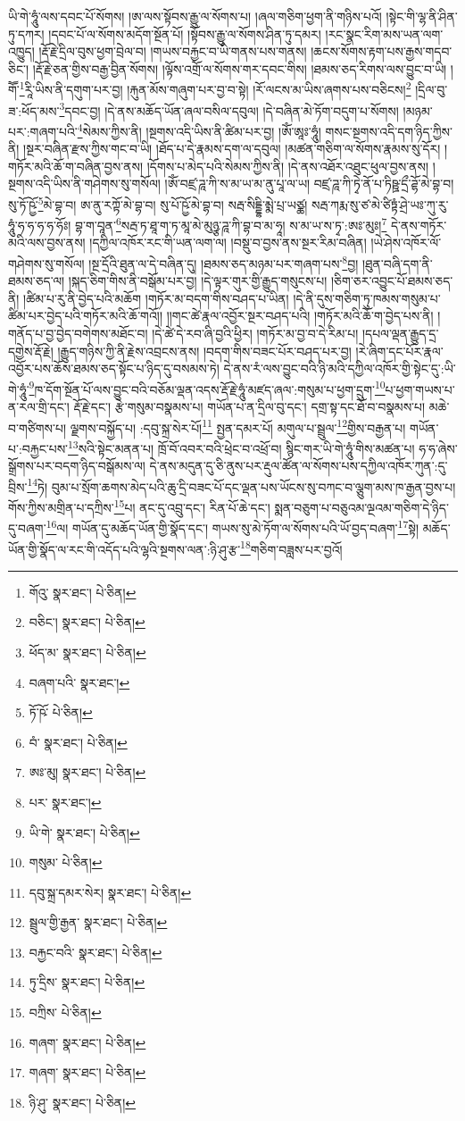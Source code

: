 ཡི་གེ་ཧཱུཾ་ལས་དབང་པོ་སོགས། །ཨ་ལས་སྟོབས་རྒྱུ་ལ་སོགས་པ། །ཞལ་གཅིག་ཕྱག་ནི་གཉིས་པའོ། །སྟེང་གི་ལྷ་ནི་ཤིན་ཏུ་དཀར། །དབང་པོ་ལ་སོགས་མདོག་སྔོན་པོ། །སྟོབས་རྒྱུ་ལ་སོགས་ཤིན་ཏུ་དམར། །རང་སྣང་རིག་མས་ཡན་ལག་འཁྱུད། །རྡོ་རྗེ་དྲིལ་བུས་ཕྱག་བྲེལ་བ། །གཡས་བརྐྱང་བ་ཡི་གནས་པས་གནས། །ཆངས་སོགས་རྟག་པས་རྒྱས་གདབ་ཅིང་། །རྡོ་རྗེ་ཅན་གྱིས་བརྒྱ་བྱིན་སོགས། །ལྟོས་འགྲོ་ལ་སོགས་གར་དབང་གིས། །ཐམས་ཅད་རིགས་ལས་བྱུང་བ་ཡི། །གཽ་\footnote{གོའུ་  སྣར་ཐང་།  པེ་ཅིན། }རཱི་ཡིས་ནི་དགུག་པར་བྱ། །རྐུན་མོས་གཞུག་པར་བྱ་བ་སྟེ། །རོ་ལངས་མ་ཡིས་ཞགས་པས་བཅིངས།\footnote{བཅིང་།  སྣར་ཐང་།  པེ་ཅིན། } །དྲིལ་བུ་ཟ་:ཕོད་མས་\footnote{ཕོད་མ་  སྣར་ཐང་།  པེ་ཅིན། }དབང་བྱ། །དེ་ནས་མཆོད་ཡོན་ཞལ་བསིལ་དབུལ། །དེ་བཞིན་མེ་ཏོག་བདུག་པ་སོགས། །མཉམ་པར་:གཞག་པའི་\footnote{བཞག་པའི་  སྣར་ཐང་། }སེམས་ཀྱིས་ནི། །སྔགས་འདི་ཡིས་ནི་ཚིམ་པར་བྱ། །ཨོཾ་ཨཱཿ་ཧཱུཾ། གསང་སྔགས་འདི་དག་ཉིད་ཀྱིས་ནི། །སྔར་བཞིན་རྫས་ཀྱིས་གང་བ་ཡི། །ཐོད་པ་དེ་རྣམས་དག་ལ་དབུལ། །མཚན་གཅིག་ལ་སོགས་རྣམས་སུ་དོར། །གཏོར་མའི་ཆོ་ག་བཞིན་བྱས་ནས། །དོགས་པ་མེད་པའི་སེམས་ཀྱིས་ནི། །དེ་ནས་འཐོར་འཐུང་ཕུལ་བྱས་ནས། །སྔགས་འདི་ཡིས་ནི་གཤེགས་སུ་གསོལ། །ཨོཾ་བཛྲ་ཌཱ་ཀི་ས་མ་ཡ་མ་ནུ་པཱ་ལ་ཡ། བཛྲ་ཌཱ་ཀི་ཏྭེ་ནོ་པ་ཏིཥྛ་དྲྀ་ཌྷོ་མེ་བྷ་བ། སུ་ཏོ་ཥྱོ་\footnote{ཏོ་ཥོ་  པེ་ཅིན། }མེ་བྷ་བ། ཨ་ནུ་རཀྟོ་མེ་བྷ་བ། སུ་པོ་ཥྱོ་མེ་བྷ་བ། སརྦ་སིདྡྷི་མྨེ་པྲ་ཡཙྪ། སརྦ་ཀརྨ་སུ་ཙ་མེ་ཙིཏྟཾ་ཤྲེ་ཡཿ་ཀུ་རུ་ཧཱུཾ་ཧ་ཧ་ཧ་ཧ་ཧོཿ། བྷ་ག་བཱན་\footnote{བཾ་  སྣར་ཐང་།  པེ་ཅིན། }སརྦ་ཏ་ཐཱ་ག་ཏ་མཱ་མེ་མུཉྩ་ཌཱ་ཀི་བྷ་བ་མ་ཧཱ། ས་མ་ཡ་ས་ཏྭ་:ཨཿ་མུཿ།\footnote{ཨཿ་མུ།  སྣར་ཐང་།  པེ་ཅིན། } དེ་ནས་གཏོར་མའི་ལས་བྱས་ནས། །དཀྱིལ་འཁོར་རང་གི་ཡན་ལག་ལ། །བསྡུ་བ་བྱས་ནས་སྔར་རིམ་བཞིན། །ཡེ་ཤེས་འཁོར་ལོ་གཤེགས་སུ་གསོལ། །སྔ་དྲོའི་ཐུན་ལ་དེ་བཞིན་དུ། །ཐམས་ཅད་མཉམ་པར་གཞག་པས་\footnote{པར་  སྣར་ཐང་། }བྱ། །ཐུན་བཞི་དག་ནི་ཐམས་ཅད་ལ། །སྐད་ཅིག་གིས་ནི་བསྒོམ་པར་བྱ། །དེ་ལྟར་གུར་གྱི་རྒྱུད་གསུངས་པ། །ཅིག་ཅར་འབྱུང་པོ་ཐམས་ཅད་ནི། །ཚིམ་པ་རུ་ནི་བྱེད་པའི་མཆོག །གཏོར་མ་བདག་གིས་བཤད་པ་ཡིན། །དེ་ནི་དུས་གཅིག་ཏུ་ཁམས་གསུམ་པ་ཚིམ་པར་བྱེད་པའི་གཏོར་མའི་ཆོ་གའོ།། །།གང་ཚེ་རྣལ་འབྱོར་སྔར་བཤད་པའི། །གཏོར་མའི་ཆོ་ག་བྱེད་པས་ནི། །གནོད་པ་བྱ་བྱེད་བགེགས་མཐོང་བ། །དེ་ཚེ་དེ་རབ་ཞི་བྱའི་ཕྱིར། །གཏོར་མ་བྱ་བ་དེ་རིམ་པ། །དཔལ་ལྡན་རྒྱུད་དྲ་དགྱེས་རྡོ་རྗེ། །རྒྱུད་གཉིས་ཀྱི་ནི་རྗེས་འབྲངས་ནས། །བདག་གིས་བཟང་པོར་བཤད་པར་བྱ། །རེ་ཞིག་དང་པོར་རྣལ་འབྱོར་པས་ཆོས་ཐམས་ཅད་སྟོང་པ་ཉིད་དུ་བསམས་ཏེ། དེ་ནས་རཾ་ལས་བྱུང་བའི་ཉི་མའི་དཀྱིལ་འཁོར་གྱི་སྟེང་དུ་:ཡི་གེ་ཧཱུཾ་\footnote{ཡི་གེ་  སྣར་ཐང་།  པེ་ཅིན། }ཁ་དོག་སྔོན་པོ་ལས་བྱུང་བའི་བཅོམ་ལྡན་འདས་རྡོ་རྗེ་ཧཱུཾ་མཛད་ཞལ་:གསུམ་པ་ཕྱག་དྲུག་\footnote{གསུམ་  པེ་ཅིན། }པ་ཕྱག་གཡས་པ་ན་རལ་གྲི་དང་། རྡོ་རྗེ་དང་། རྩེ་གསུམ་བསྣམས་པ། གཡོན་པ་ན་དྲིལ་བུ་དང་། དགྲ་སྟ་དང་ཐོ་བ་བསྣམས་པ། མཆེ་བ་གཙིགས་པ། ལྗགས་བསྐྱོད་པ། :དབུ་སྐྲ་སེར་པོ།\footnote{དབུ་སྐྲ་དམར་སེར།  སྣར་ཐང་།  པེ་ཅིན། } སྤྱན་དམར་པོ། མགུལ་པ་སྦྲུལ་\footnote{སྦྲུལ་གྱི་རྒྱན་  སྣར་ཐང་།  པེ་ཅིན། }གྱིས་བརྒྱན་པ། གཡོན་པ་:བརྐྱང་པས་\footnote{བརྐྱང་བའི་  སྣར་ཐང་།  པེ་ཅིན། }སའི་སྟེང་མནན་པ། ཁྲོ་བོ་འབར་བའི་ཕྲེང་བ་འཕྲོ་བ། སྙིང་གར་ཡི་གེ་ཧཱུཾ་གིས་མཚན་པ། ཧ་ཧ་ཞེས་སྒྲོགས་པར་བདག་ཉིད་བསྒོམས་ལ། དེ་ནས་མདུན་དུ་ཅི་ནུས་པར་རྡུལ་ཚོན་ལ་སོགས་པས་དཀྱིལ་འཁོར་ཀུན་:དུ་བྲིས་\footnote{ཏུ་དྲིས་  སྣར་ཐང་།  པེ་ཅིན། }ཏེ། བུམ་པ་སྲོག་ཆགས་མེད་པའི་ཆུ་དྲི་བཟང་པོ་དང་ལྡན་པས་ཡོངས་སུ་བཀང་བ་ལྕུག་མས་ཁ་རྒྱན་བྱས་པ། གོས་ཀྱིས་མགྲིན་པ་དཀྲིས་\footnote{བཀྲིས་  པེ་ཅིན། }པ། ནང་དུ་འབྲུ་དང་། རིན་པོ་ཆེ་དང་། སྨན་བཅུག་པ་བཅུའམ་ལྔའམ་གཅིག་དེ་ཉིད་དུ་བཞག་\footnote{གཞག་  སྣར་ཐང་།  པེ་ཅིན། }ལ། གཡོན་དུ་མཆོད་ཡོན་གྱི་སྣོད་དང་། གཡས་སུ་མེ་ཏོག་ལ་སོགས་པའི་ཡོ་བྱད་བཞག་\footnote{གཞག་  སྣར་ཐང་།  པེ་ཅིན། }སྟེ། མཆོད་ཡོན་གྱི་སྣོད་ལ་རང་གི་འདོད་པའི་ལྷའི་སྔགས་ལན་:ཉི་ཤུ་རྩ་\footnote{ཉི་ཤུ་  སྣར་ཐང་།  པེ་ཅིན། }གཅིག་བཟླས་པར་བྱའོ། 